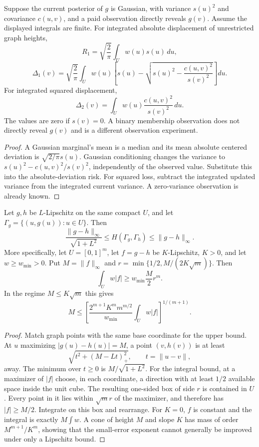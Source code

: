 \begin{proposition}
\label{rthreegeo:gaussiangraph}
Suppose the current posterior of $g$ is Gaussian, with variance $s(u)^2$
and covariance $c(u,v)$, and a paid observation directly reveals $g(v)$.
Assume the displayed integrals are finite. For integrated absolute
displacement of unrestricted graph heights,
\[
 R_1=\sqrt{\frac2\pi}\int_U w(u)s(u)\,du,
\]
\[
 \Delta_1(v)=\sqrt{\frac2\pi}\int_Uw(u)
 \left[s(u)-\sqrt{s(u)^2-\frac{c(u,v)^2}{s(v)^2}}\right]du.
\]
For integrated squared displacement,
\[
 \Delta_2(v)=\int_Uw(u)\frac{c(u,v)^2}{s(v)^2}\,du.
\]
The values are zero if $s(v)=0$. A binary membership observation does not
directly reveal $g(v)$ and is a different observation experiment.
\end{proposition}
\begin{proof}
A Gaussian marginal's mean is a median and its mean absolute centered
deviation is $\sqrt{2/\pi}s(u)$. Gaussian conditioning changes the variance
to $s(u)^2-c(u,v)^2/s(v)^2$, independently of the observed value.
Substitute this into the absolute-deviation risk. For squared loss,
subtract the integrated updated variance from the integrated current
variance. A zero-variance observation is already known.
\end{proof}

\begin{proposition}
\label{rthreegeo:holderbridge}
Let $g,h$ be $L$-Lipschitz on the same compact $U$, and let
$\Gamma_g=\{(u,g(u)):u\in U\}$. Then
\[
 \frac{\|g-h\|_\infty}{\sqrt{1+L^2}}
 \le H(\Gamma_g,\Gamma_h)\le\|g-h\|_\infty.
\]
More specifically, let $U=[0,1]^m$, let $f=g-h$ be $K$-Lipschitz,
$K>0$, and let $w\ge w_{\min}>0$. Put $M=\|f\|_\infty$ and
$r=\min\{1/2,M/(2K\sqrt m)\}$. Then
\[
 \int_Uw|f|\ge w_{\min}\frac M2 r^m.
\]
In the regime $M\le K\sqrt m$ this gives
\[
 M\le\left[
 \frac{2^{m+1}K^m m^{m/2}}{w_{\min}}\int_Uw|f|
 \right]^{1/(m+1)}.
\]
\end{proposition}
\begin{proof}
Match graph points with the same base coordinate for the upper bound.
At $u$ maximizing $|g(u)-h(u)|=M$, a point $(v,h(v))$ is at least
\[
 \sqrt{t^2+(M-Lt)_+^2},\qquad t=\|u-v\|,
\]
away. The minimum over $t\ge0$ is $M/\sqrt{1+L^2}$.
For the integral bound, at a maximizer of $|f|$ choose, in each coordinate,
a direction with at least $1/2$ available space inside the unit cube.
The resulting one-sided box of side $r$ is contained in $U$. Every point
in it lies within $\sqrt m r$ of the maximizer, and therefore has
$|f|\ge M/2$. Integrate on this box and rearrange. For $K=0$, $f$ is
constant and the integral is exactly $M\int w$. A cone of height $M$
and slope $K$ has mass of order $M^{m+1}/K^m$, showing that the
small-error exponent cannot generally be improved under only a
Lipschitz bound.
\end{proof}

